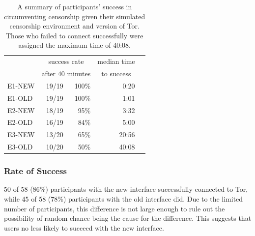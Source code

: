 \documentclass[USenglish,oneside,twocolumn]{article}
\begin{document}
\begin{table}
\centering
	\begin{tabular}{l r r r r}
	& \multicolumn{2}{c}{success rate} & \multicolumn{1}{c}{median time} \\
	& \multicolumn{2}{c}{after 40 minutes} & \multicolumn{1}{c}{to success} \\
	\noalign{\hrule}
	E1-NEW & 19/19 & 100\% & 0:20 \\ %
	E1-OLD & 19/19 & 100\% & 1:01 \\ %
	E2-NEW & 18/19 & 95\% & 3:32 \\ %
	E2-OLD & 16/19 & 84\% & 5:00 \\ %
	E3-NEW & 13/20 & 65\% & 20:56 \\ %
	E3-OLD & 10/20 & 50\% & 40:08 \\ %
	\end{tabular}
\caption{
A summary of participants' success in circumventing censorship
given their simulated censorship environment and version of Tor. Those who
failed to connect successfully were assigned the maximum time of 40:08.
}
\label{table:participant-summary}
\end{table}

\subsubsection{Rate of Success} 
50 of 58 (86\%) participants with the new interface successfully connected to Tor, while 45 of 58 (78\%) participants with the old interface did. 
Due to the limited number of participants, this difference is not large enough to rule out the possibility of random chance being the cause for the difference. This suggests that users no less likely to succeed with the new interface. 

\end{document}
